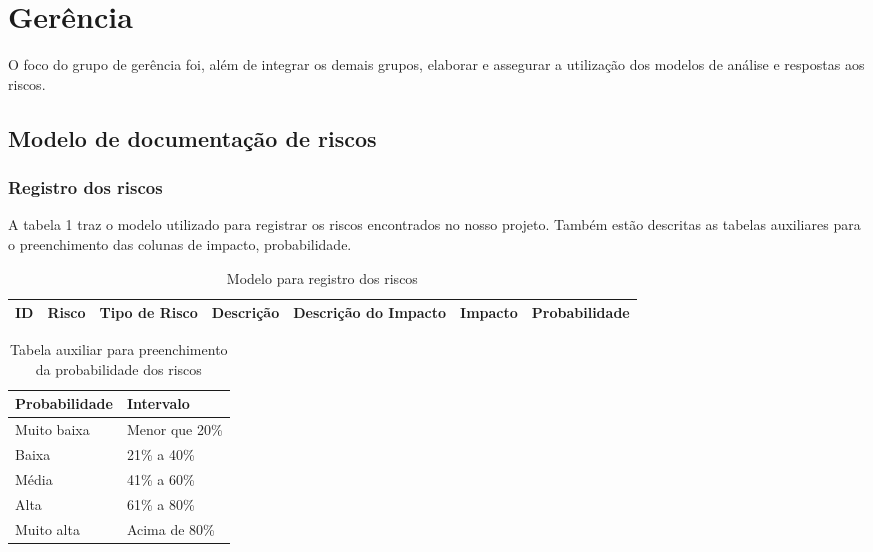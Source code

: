\section{Gerência}

O foco do grupo de gerência foi, além de integrar os demais grupos, elaborar e assegurar a utilização dos modelos de análise e respostas aos riscos.

\subsection{Modelo de documentação de riscos}

\subsubsection{Registro dos riscos}
A tabela 1 traz o modelo utilizado para registrar os riscos encontrados no nosso projeto. Também estão descritas as tabelas auxiliares para o preenchimento das colunas de impacto, probabilidade.
\newpage

\begin{table}[h]
    \centering
    \begin{tabular}{|p{1cm}|p{2cm}|p{2cm}|p{2cm}|p{2cm}|p{1.7cm}|p{2.9cm}|}
    \hline
    \textbf{ID}  & \textbf{Risco} & \textbf{Tipo de Risco} & \textbf{Descrição} & \textbf{Descrição do Impacto} & \textbf{Impacto} & \textbf{Probabilidade} \\ \hline
\end{tabular}
    \caption{Modelo para registro dos riscos}
    \end{table}

    \begin{table}[h]
        \centering
        \begin{tabular}{|p{3cm}|p{3cm}|}
        \hline
        \textbf{Probabilidade}  & \textbf{Intervalo} \\ \hline
        Muito baixa & Menor que 20\% \\ \hline
        Baixa & 21\% a 40\% \\ \hline
        Média & 41\% a 60\% \\ \hline
        Alta & 61\% a 80\%\\ \hline
        Muito alta & Acima de 80\%\\ \hline
    \end{tabular}
        \caption{Tabela auxiliar para preenchimento da probabilidade dos riscos}
        \end{table}

